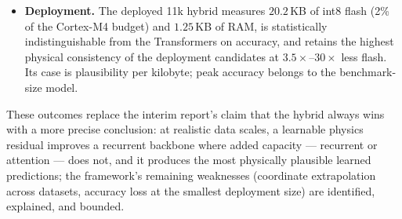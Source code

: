\begin{itemize}
    route~B degrades out of distribution ($0.2077$) because its cycle
    coordinate extrapolates beyond the training range; and shrinking to the
    11k deployment size costs accuracy ($0.0292 \rightarrow 0.0469$) with high
    fold-to-fold variance.
    \item \textbf{Deployment.} The deployed 11k hybrid measures $20.2$\,KB of
    int8 flash (2\% of the Cortex-M4 budget) and $1.25$\,KB of RAM, is
    statistically indistinguishable from the Transformers on accuracy, and
    retains the highest physical consistency of the deployment candidates at
    $3.5\times$--$30\times$ less flash. Its case is plausibility per kilobyte;
    peak accuracy belongs to the benchmark-size model.
\end{itemize}

These outcomes replace the interim report's claim that the hybrid always wins
with a more precise conclusion: at realistic data scales, a learnable physics
residual improves a recurrent backbone where added capacity --- recurrent or
attention --- does not, and it produces the most physically plausible learned
predictions; the framework's remaining weaknesses (coordinate extrapolation
across datasets, accuracy loss at the smallest deployment size) are identified,
explained, and bounded.
